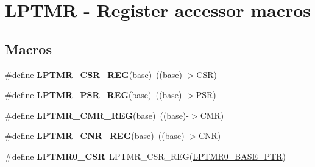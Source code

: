 \hypertarget{group___l_p_t_m_r___register___accessor___macros}{}\section{L\+P\+T\+MR -\/ Register accessor macros}
\label{group___l_p_t_m_r___register___accessor___macros}
\subsection*{Macros}
\begin{DoxyCompactItemize}
\item 
\mbox{\label{group___l_p_t_m_r___register___accessor___macros_ga3e6fc450d0d86591343057973f33b114}} 
\#define {\bfseries L\+P\+T\+M\+R\+\_\+\+C\+S\+R\+\_\+\+R\+EG}(base)~((base)-\/$>$C\+SR)
\item 
\mbox{\label{group___l_p_t_m_r___register___accessor___macros_ga5466d25d6ed5404f2257f2d06c0d21f5}} 
\#define {\bfseries L\+P\+T\+M\+R\+\_\+\+P\+S\+R\+\_\+\+R\+EG}(base)~((base)-\/$>$P\+SR)
\item 
\mbox{\label{group___l_p_t_m_r___register___accessor___macros_ga0f229f84385a307ae6fa7133c9b0d2f0}} 
\#define {\bfseries L\+P\+T\+M\+R\+\_\+\+C\+M\+R\+\_\+\+R\+EG}(base)~((base)-\/$>$C\+MR)
\item 
\mbox{\label{group___l_p_t_m_r___register___accessor___macros_ga0256237249b333d5beffb46f115f5659}} 
\#define {\bfseries L\+P\+T\+M\+R\+\_\+\+C\+N\+R\+\_\+\+R\+EG}(base)~((base)-\/$>$C\+NR)
\item 
\mbox{\label{group___l_p_t_m_r___register___accessor___macros_ga92117617fde3b4150e2c04e6f828f565}} 
\#define {\bfseries L\+P\+T\+M\+R0\+\_\+\+C\+SR}~L\+P\+T\+M\+R\+\_\+\+C\+S\+R\+\_\+\+R\+EG(\hyperlink{group___l_p_t_m_r___peripheral_ga90a9194151ad11b422bcab162e797eda}{L\+P\+T\+M\+R0\+\_\+\+B\+A\+S\+E\+\_\+\+P\+TR})
\item 
\mbox{\label{group___l_p_t_m_r___register___accessor___macros_ga69b40af8e215d5b29b3f9677d7f8d632}} 

\end{DoxyCompactItemize}
